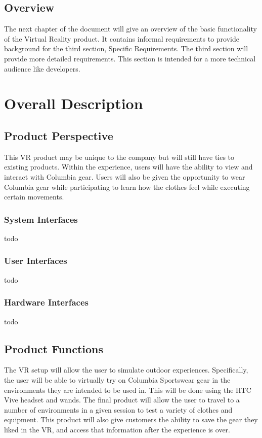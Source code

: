 \documentclass[10pt,journal,compsoc,onecolumn]{IEEEtran}
\begin{document}
\subsection{Overview}
The next chapter of the document will give an overview of the basic functionality
of the Virtual Reality product. It contains informal requirements to provide
background for the third section, Specific Requirements. The third section
will provide more detailed requirements. This section is intended for a more
technical audience like developers.

\section{Overall Description}
\subsection{Product Perspective}
This VR product may be unique to the company but will still have ties to
existing products. Within the experience, users will have the ability to view
and interact with Columbia gear. Users will also be given the opportunity to
wear Columbia gear while participating to learn how the clothes feel while
executing certain movements.

\subsubsection{System Interfaces}
todo
\subsubsection{User Interfaces}
todo
\subsubsection{Hardware Interfaces}
todo

\subsection{Product Functions}
The VR setup will allow the user to simulate outdoor experiences.
Specifically, the user will be able to virtually try on Columbia Sportswear
gear in the environments they are intended to be used in.
This will be done using the HTC Vive headset and wands. The final product
will allow the user to travel to a number of environments in a given session to
test a variety of clothes and equipment. This product will also give customers
the ability to save the gear they liked in the VR, and access that information after the experience is over.
\end{document}
